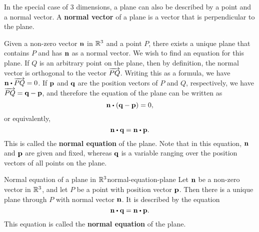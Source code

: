 In the special case of 3 dimensions, a plane can also be described by
a point and a normal vector. A \textbf{normal vector}%
%
%
 of a plane is a vector that is
perpendicular to the plane.
\begin{center}
\end{center}
Given a non-zero vector $\vect{n}$ in $\mathbb{R}^3$ and a point $P$, there
exists a unique plane that contains $P$ and has $\vect{n}$ as a normal
vector. We wish to find an equation for this plane. If $Q$ is an
arbitrary point on the plane, then by definition, the normal vector is
orthogonal to the vector $\overrightarrow{PQ}$. Writing this as a formula,
we have $\vect{n} \dotprod \longvect{PQ} = 0$. If $\vect{p}$ and
$\vect{q}$ are the position vectors of $P$ and $Q$, respectively, we
have $\longvect{PQ} = \vect{q}-\vect{p}$, and therefore the equation
of the plane can be written as
\begin{equation*}
  \vect{n} \dotprod (\vect{q}-\vect{p}) = 0,
\end{equation*}
or equivalently,
\begin{equation*}
  \vect{n} \dotprod \vect{q} = \vect{n} \dotprod \vect{p}.
\end{equation*}
This is called the \textbf{normal equation} of the plane. Note that in
this equation, $\vect{n}$ and $\vect{p}$ are given and fixed, whereas
$\vect{q}$ is a variable ranging over the position vectors of all
points on the plane.

\begin{definition}{Normal equation of a plane in $\mathbb{R}^3$}{normal-equation-plane}
  Let $\vect{n}$ be a non-zero vector in $\mathbb{R}^3$, and let $P$ be a
  point with position vector $\vect{p}$. Then there is a unique plane through
  $P$ with normal vector $\vect{n}$. It is described by the equation
  \begin{equation*}
    \vect{n} \dotprod \vect{q} = \vect{n} \dotprod \vect{p}.
  \end{equation*}
  This equation is called the \textbf{normal equation}%
   of the plane.
\end{definition}

